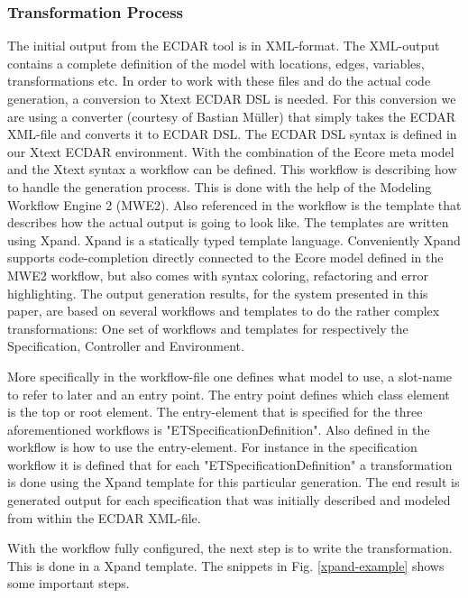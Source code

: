 \subsubsection{Transformation Process}
\label{transformation-process}

The initial output from the ECDAR tool is in XML-format. The XML-output
contains a complete definition of the model with locations, edges, variables,
transformations etc. In order to work with these files and do the actual code
generation, a conversion to Xtext ECDAR DSL is needed. For this conversion we
are using a converter (courtesy of Bastian M\"uller) that simply takes the ECDAR XML-file
and converts it to ECDAR DSL. The ECDAR DSL syntax is defined in our Xtext ECDAR
environment. With the combination of the Ecore meta model and the Xtext syntax a
workflow can be defined. This workflow is describing how to handle the
generation process. This is done with the help of the Modeling Workflow Engine 2
(MWE2). Also referenced in the workflow is the template that describes how the
actual output is going to look like. The templates are written using
Xpand. Xpand is a statically typed template language. Conveniently Xpand
supports code-completion directly connected to the Ecore model defined in the
MWE2 workflow, but also comes with syntax coloring, refactoring and error
highlighting. The output generation results, for the system presented in this
paper, are based on several workflows and templates to do the rather complex
transformations: One set of workflows and templates for respectively the
Specification, Controller and Environment.

More specifically in the workflow-file one defines what model to use, a
slot-name to refer to later and an entry point. The entry point defines which
class element is the top or root element. The entry-element that is specified for
the three aforementioned workflows is "ETSpecificationDefinition". Also defined
in the workflow is how to use the entry-element. For instance in the
specification workflow it is defined that for each "ETSpecificationDefinition" a
transformation is done using the Xpand template for this particular
generation. The end result is generated output for each specification that
was initially described and modeled from within the ECDAR XML-file.

With the workflow fully configured, the next step is to write the
transformation. This is done in a Xpand template. The snippets in Fig.
\ref{xpand-example} shows some important steps.

